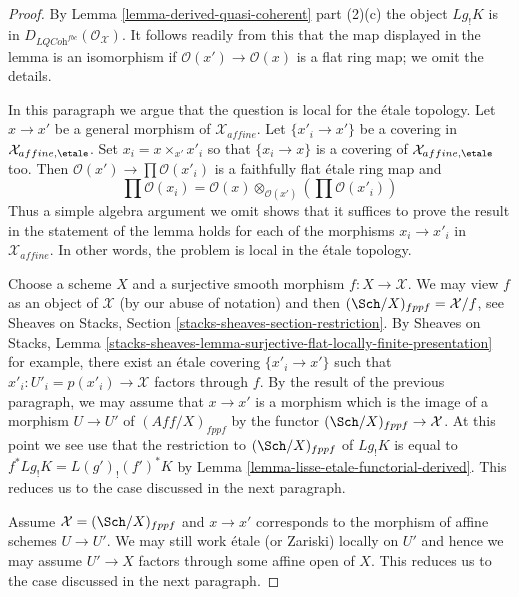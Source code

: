 \begin{proof}
By Lemma \ref{lemma-derived-quasi-coherent} part (2)(c) the object
$Lg_!K$ is in $D_{\textit{LQCoh}^{fbc}}(\mathcal{O}_\mathcal{X})$.
It follows readily from this that the map displayed in the lemma
is an isomorphism if $\mathcal{O}(x') \to \mathcal{O}(x)$ is a flat
ring map; we omit the details.

\medskip\noindent
In this paragraph we argue that the question is local for the \'etale topology.
Let $x \to x'$ be a general morphism of $\mathcal{X}_{affine}$.
Let $\{x'_i \to x'\}$ be a covering in
$\mathcal{X}_{affine, \etale}$. Set $x_i = x \times_{x'} x'_i$
so that $\{x_i \to x\}$ is a covering of $\mathcal{X}_{affine, \etale}$
too. Then $\mathcal{O}(x') \to \prod \mathcal{O}(x'_i)$ is a
faithfully flat \'etale ring map and
$$
\prod \mathcal{O}(x_i) =
\mathcal{O}(x) \otimes_{\mathcal{O}(x')} \left(\prod \mathcal{O}(x'_i)\right)
$$
Thus a simple algebra argument we omit shows that
it suffices to prove the result in the statement of the lemma
holds for each of the morphisms $x_i \to x'_i$ in
$\mathcal{X}_{affine}$. In other words, the problem is local in
the \'etale topology.

\medskip\noindent
Choose a scheme $X$ and a surjective smooth morphism $f : X \to \mathcal{X}$.
We may view $f$ as an object of $\mathcal{X}$ (by our abuse of notation)
and then $(\Sch/X)_{fppf} = \mathcal{X}/f$, see
Sheaves on Stacks, Section \ref{stacks-sheaves-section-restriction}.
By Sheaves on Stacks, Lemma
\ref{stacks-sheaves-lemma-surjective-flat-locally-finite-presentation}
for example, there exist an \'etale covering $\{x'_i \to x'\}$
such that $x'_i : U'_i = p(x'_i) \to \mathcal{X}$ factors through $f$.
By the result of the previous paragraph,
we may assume that $x \to x'$ is a morphism which is the
image of a morphism $U \to U'$ of $(\textit{Aff}/X)_{fppf}$ by the functor
$(\Sch/X)_{fppf} \to \mathcal{X}$.
At this point we see use that the restriction to $(\Sch/X)_{fppf}$
of $Lg_!K$ is equal to $f^*Lg_!K = L(g')_!(f')^*K$ by
Lemma \ref{lemma-lisse-etale-functorial-derived}.
This reduces us to the case discussed in the next paragraph.

\medskip\noindent
Assume $\mathcal{X} = (\Sch/X)_{fppf}$ and $x \to x'$ corresponds
to the morphism of affine schemes $U \to U'$. We may still work
\'etale (or Zariski) locally on $U'$ and hence we may assume
$U' \to X$ factors through some affine open of $X$.
This reduces us to the case discussed in the next paragraph.


\end{proof}
